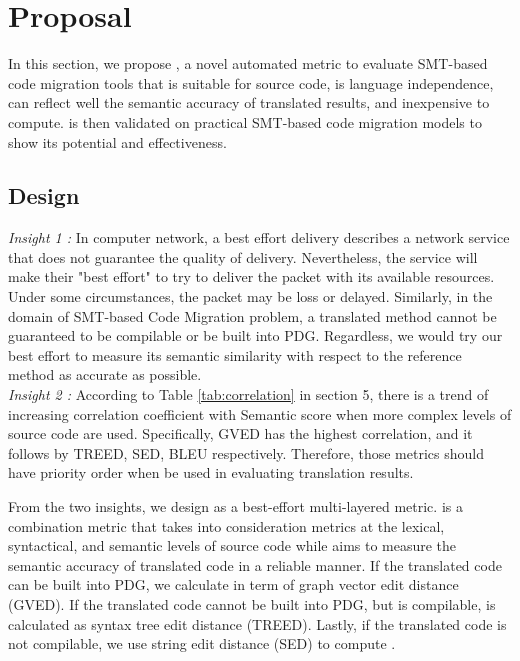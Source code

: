 \section{Proposal}
In this section, we propose {\model}, a novel automated metric to evaluate SMT-based code migration tools that is suitable for source code, is language independence, can reflect well the semantic accuracy of translated results, and inexpensive to compute. {\model} is then validated on practical SMT-based code migration models to show its potential and effectiveness. 

\subsection{Design}


\emph{Insight 1 :} In computer network, a best effort delivery describes a network service that does not guarantee the quality of delivery. Nevertheless, the service will make their "best effort" to try to deliver the packet with its available resources. Under some circumstances, the packet may be loss or delayed. Similarly, in the domain of SMT-based Code Migration problem, a translated method cannot be guaranteed to be compilable or be built into PDG. Regardless, we would try our best effort to measure its semantic similarity with respect to the reference method as accurate as possible. \\
\emph{Insight 2 :}
According to Table \ref{tab:correlation} in section 5, there is a trend of increasing correlation coefficient with Semantic score when more complex levels of source code are used. Specifically, GVED has the highest correlation, and it follows by TREED, SED, BLEU respectively. Therefore, those metrics should have priority order when be used in evaluating translation results.  

From the two insights, we design {\model} as a best-effort multi-layered metric. {\model} is a combination metric that takes into consideration metrics at the lexical, syntactical, and semantic levels of source code while aims to measure the semantic accuracy of translated code in a reliable manner. If the translated code can be built into PDG, we calculate {\model} in term of graph vector edit distance (GVED). If the translated code cannot be built into PDG, but is compilable, {\model} is calculated as syntax tree edit distance (TREED). Lastly, if the translated code is not compilable, we use string edit distance (SED) to compute {\model}.

